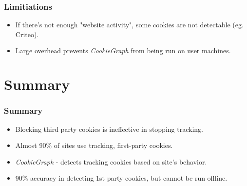 \documentclass{beamer}
\begin{document}
\begin{frame}
\frametitle{Limitiations}

\begin{itemize}
\item If there's not enough "website activity", some cookies are not detectable (eg. Criteo).
\item Large overhead prevents \textit{CookieGraph} from being run on user machines.
\end{itemize}

\end{frame}


\section{Summary}

\begin{frame}
\frametitle{Summary}

\begin{itemize}
\item Blocking third party cookies is ineffective in stopping tracking.
\item Almost 90\% of sites use tracking, first-party cookies.
\item \textit{CookieGraph} - detects tracking cookies based on site's behavior.
\item 90\% accuracy in detecting 1st party cookies, but cannot be run offline.
\end{itemize}

\end{frame}
\end{document}
